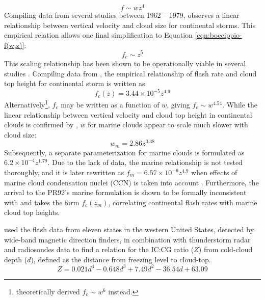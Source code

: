 	\begin{equation}\label{eqn:boccippio-f(w,z)}
		f\sim wz^4
	\end{equation}
	Compiling data from several studies between 1962 -- 1979, \citet{Williams:1985fk} observes a linear relationship between vertical velocity and cloud size for continental storms. This empirical relation allows one final simplification to Equation \ref{eqn:boccippio-f(w,z)}:
	\begin{equation}\label{eqn:w85-f(z)}
		f_c\sim z^5
	\end{equation}
	This scaling relationship has been shown to be operationally viable in several studies \citep[e.g.][]{Yoshida:2009vn, Ushio:2001kx}. Compiling data from \citet{Williams:1985fk}, the empirical relationship of flash rate and cloud top height for continental storm is written as \citep[][hereafter PR92]{Price:1992wb}
	\begin{equation}\label{eqn:pr92-fc(z)}
		f_c(z) = 3.44\times10^{-5}z^{4.9}
	\end{equation}
	Alternatively\footnote{\citet{Baker:1995uq} theoretically derived $f_c\sim w^6$ instead.}, $f_c$ may be written as a function of $w$, giving $f_c\sim w^{4.54}$. While the linear relationship between vertical velocity and cloud top height in continental clouds is confirmed by \citet{Price:1992wb}, $w$ for marine clouds appear to scale much slower with cloud size:
	\begin{equation}\label{eqn:pr92-wm}
		w_m = 2.86z^{0.38}
	\end{equation}
	Subsequently, a separate parameterization for marine clouds is formulated as $6.2\times10^{-4}z^{1.79}$. Due to the lack of data, the marine relationship is not tested thoroughly, and it is later rewritten as $f_m=6.57\times10^{-6}z^{4.9}$ when effects of marine cloud condensation nuclei (CCN) is taken into account \citep{Michalon:1999fk}. Furthermore, the arrival to the PR92's marine formulation is shown to be formally inconsistent with \citet{Vonnegut:1963aa} and takes the form $f_c(z_m)$, {\ie} correlating continental flash rates with marine cloud top heights\citep{Boccippio:2002uq}.

	\citet{Price:1993fk} used the flash data from eleven states in the western United States, detected by wide-band magnetic direction finders, in combination with thunderstorm radar and radiosondes data to find a relation for the IC:CG ratio ($Z$) from cold-cloud depth ($d$), defined as the distance from freezing level to cloud-top.
	\begin{equation}\label{eqn:pr93-Z}
		Z = 0.021d^4-0.648d^3+7.49d^2-36.54d + 63.09
	\end{equation}
	
